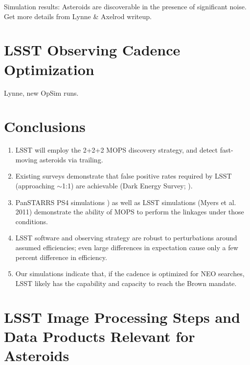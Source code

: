 \documentclass[12pt,preprint]{aastex}
\begin{document}
Simulation results: Asteroids are discoverable in the presence of significant noise.
Get more details from Lynne \& Axelrod writeup. 



\section{LSST Observing Cadence Optimization}

Lynne, new OpSim runs. 


\section{Conclusions}

\begin{enumerate}
\item LSST will employ the 2+2+2 MOPS discovery strategy, and detect fast-moving asteroids via trailing.
\item Existing surveys demonstrate that false positive rates required
  by LSST (approaching $\sim$1:1) are  achievable (Dark Energy Survey;  \citep{goldstein2015}).
\item PanSTARRS PS4 simulations \citep{denneau13}) as well as LSST
  simulations (Myers et al. 2011) demonstrate the ability of MOPS to perform the linkages under those conditions.
\item LSST software and observing strategy are robust to perturbations
  around assumed efficiencies; even large differences in expectation
  cause only a few percent difference in efficiency. 
\item Our simulations indicate that, if the cadence is optimized for
  NEO searches, LSST likely has the capability and capacity to reach the Brown mandate.
\end{enumerate}


\appendix
\section{LSST Image Processing Steps and Data Products Relevant for Asteroids} \label{sec:AppA}
% 





\end{document}
